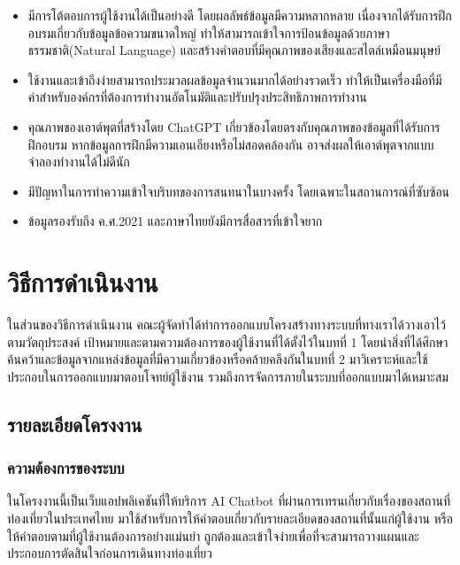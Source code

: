\documentclass[12pt,oneside,openright,a4paper]{cpe-thai-project}
\begin{document}

\begin{itemize}
\item มีการโต้ตอบการผู้ใช้งานได้เป็นอย่างดี โดยผลลัพธ์ข้อมูลมีความหลากหลาย เนื่องจากได้รับการฝึกอบรมเกี่ยวกับข้อมูลข้อความขนาดใหญ่ ทำให้สามารถเข้าใจการป้อนข้อมูลด้วยภาษาธรรมชาติ(Natural Language) และสร้างคำตอบที่มีคุณภาพของเสียงและสไตล์เหมือนมนุษย์
\item ใช้งานและเข้าถึงง่ายสามารถประมวลผลข้อมูลจำนวนมากได้อย่างรวดเร็ว ทำให้เป็นเครื่องมือที่มีค่าสำหรับองค์กรที่ต้องการทำงานอัตโนมัติและปรับปรุงประสิทธิภาพการทำงาน
\end{itemize}
\begin{itemize}
\item คุณภาพของเอาต์พุตที่สร้างโดย ChatGPT เกี่ยวข้องโดยตรงกับคุณภาพของข้อมูลที่ได้รับการฝึกอบรม หากข้อมูลการฝึกมีความเอนเอียงหรือไม่สอดคล้องกัน อาจส่งผลให้เอาต์พุตจากแบบจำลองทำงานได้ไม่ดีนัก
\item มีปัญหาในการทำความเข้าใจบริบทของการสนทนาในบางครั้ง โดยเฉพาะในสถานการณ์ที่ซับซ้อน
\item ข้อมูลรองรับถึง ค.ศ.2021 และภาษาไทยยังมีการสื่อสารที่เข้าใจยาก
\end{itemize}

\chapter{วิธีการดำเนินงาน}
ในส่วนของวิธีการดําเนินงาน คณะผู้จัดทําได้ทำการออกแบบโครงสร้างทางระบบที่ทางเราได้วางเอาไว้ตามวัตถุประสงค์ เป้าหมายและตามความต้องการของผู้ใช้งานที่ได้ตั้งไว้ในบทที่ 1 โดยนําสิ่งที่ได้ศึกษาค้นคว้าและข้อมูลจากแหล่งข้อมูลที่มีความเกี่ยวข้องหรือคล้ายคลึงกันในบทที่ 2 มาวิเคราะห์และใช้ประกอบในการออกแบบมาตอบโจทย์ผู้ใช้งาน รวมถึงการจัดการภายในระบบที่ออกแบบมาได้เหมาะสม

\section{รายละเอียดโครงงาน}
\subsection{ความต้องการของระบบ}
ในโครงงานนี้เป็นเว็บแอปพลิเคชันที่ให้บริการ AI Chatbot ที่ผ่านการเทรนเกี่ยวกับเรื่องของสถานที่ท่องเที่ยวในประเทศไทย มาใช้สำหรับการให้คำตอบเกี่ยวกับรายละเอียดของสถานที่นั้นแก่ผู้ใช้งาน หรือให้คำตอบตามที่ผู้ใช้งานต้องการอย่างแม่นยำ ถูกต้องและเข้าใจง่ายเพื่อที่จะสามารถวางแผนและประกอบการตัดสินใจก่อนการเดินทางท่องเที่ยว
\end{document}
